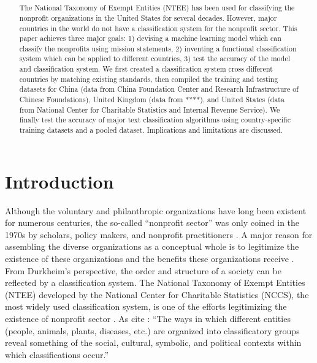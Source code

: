 \documentclass[12pt]{article}
\title{\textbf{\capitalisewords{A supervised machine-learning approach to multidimensional nonprofit classification system: Experimentation, validation, and replication}}}
\date{} %
\begin{document}
\maketitle

\begin{abstract}
\noindent The National Taxonomy of Exempt Entities (NTEE) has been used for classifying the nonprofit organizations in the United States for several decades. However, major countries in the world do not have a classification system for the nonprofit sector. This paper achieves three major goals: 1) devising a machine learning model which can classify the nonprofits using mission statements, 2) inventing a functional classification system which can be applied to different countries, 3) test the accuracy of the model and classification system. We first created a classification system cross different countries by matching existing standards, then compiled the training and testing datasets for China (data from China Foundation Center and Research Infrastructure of Chinese Foundations), United Kingdom (data from ****), and United States (data from National Center for Charitable Statistics and Internal Revenue Service). We finally test the accuracy of major text classification algorithms using country-specific training datasets and a pooled dataset. Implications and limitations are discussed.
\end{abstract}

\section{Introduction}

Although the voluntary and philanthropic organizations have long been existent for numerous centuries, the so-called ``nonprofit sector'' was only coined in the 1970s by scholars, policy makers, and nonprofit practitioners \parencite{HallHistoricalOverviewPhilanthropy2006}. A major reason for assembling the diverse organizations as a conceptual whole is to legitimize the existence of these organizations and the benefits these organizations receive \parencite{HallHistoricalOverviewPhilanthropy2006,BarmanClassificatoryStrugglesNonprofit2013}. From Durkheim's \citeyear{DurkheimElementaryFormsReligious2012} perspective, the order and structure of a society can be reflected by a classification system. The National Taxonomy of Exempt Entities (NTEE) developed by the National Center for Charitable Statistics (NCCS), the most widely used classification system, is one of the efforts legitimizing the existence of nonprofit sector \parencite{Hodgkinsonnewresearchplanning1991,HodgkinsonMappingnonprofitsector1990}. As \textcite[105]{BarmanClassificatoryStrugglesNonprofit2013} cite \textcite[601]{ClarkeSimpleTechnologyComplex1996}: ``The ways in which different entities (people, animals, plants, diseases, etc.) are organized into classificatory groups reveal something of the social, cultural, symbolic, and political contexts within which classifications occur.''
\end{document}
